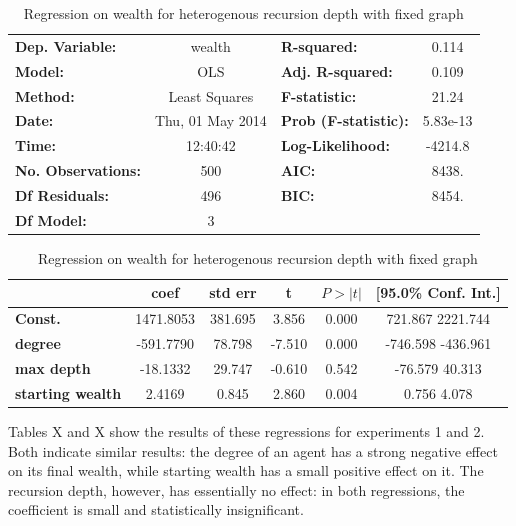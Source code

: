 \documentclass{article}
\begin{document}
\begin{table}
\begin{tabular}{lclc}
\toprule
\textbf{Dep. Variable:}    &      wealth      & \textbf{  R-squared:         } &    0.114  \\
\textbf{Model:}            &       OLS        & \textbf{  Adj. R-squared:    } &    0.109  \\
\textbf{Method:}           &  Least Squares   & \textbf{  F-statistic:       } &    21.24  \\
\textbf{Date:}             & Thu, 01 May 2014 & \textbf{  Prob (F-statistic):} & 5.83e-13  \\
\textbf{Time:}             &     12:40:42     & \textbf{  Log-Likelihood:    } &  -4214.8  \\
\textbf{No. Observations:} &         500      & \textbf{  AIC:               } &    8438.  \\
\textbf{Df Residuals:}     &         496      & \textbf{  BIC:               } &    8454.  \\
\textbf{Df Model:}         &           3      & \textbf{                     } &           \\
\bottomrule
\end{tabular}

\begin{tabular}{lccccc}
\toprule
                         & \textbf{coef} & \textbf{std err} & \textbf{t} & \textbf{$P>|t|$} & \textbf{[95.0\% Conf. Int.]}  \\
\midrule
\textbf{Const.}          &    1471.8053  &      381.695     &     3.856  &      0.000     &       721.867  2221.744      \\
\textbf{degree}          &    -591.7790  &       78.798     &    -7.510  &      0.000     &      -746.598  -436.961      \\
\textbf{max depth}       &     -18.1332  &       29.747     &    -0.610  &      0.542     &       -76.579    40.313      \\
\textbf{starting wealth} &       2.4169  &        0.845     &     2.860  &      0.004     &         0.756     4.078      \\
\bottomrule
\end{tabular}
\caption{Regression on wealth for heterogenous recursion depth with fixed graph}
\end{table}

Tables X and X show the results of these regressions for experiments 1 and 2. Both indicate similar results: the degree of an agent has a strong negative effect on its final wealth, while starting wealth has a small positive effect on it. The recursion depth, however, has essentially no effect: in both regressions, the coefficient is small and statistically insignificant. 
\end{document}
